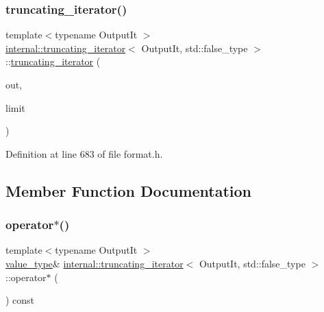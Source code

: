\subsubsection{\texorpdfstring{truncating\+\_\+iterator()}{truncating\_iterator()}}
{\footnotesize\ttfamily template$<$typename Output\+It $>$ \\
\hyperlink{classinternal_1_1truncating__iterator}{internal\+::truncating\+\_\+iterator}$<$ Output\+It, std\+::false\+\_\+type $>$\+::\hyperlink{classinternal_1_1truncating__iterator}{truncating\+\_\+iterator} (\begin{DoxyParamCaption}\item[{Output\+It}]{out,  }\item[{std\+::size\+\_\+t}]{limit }\end{DoxyParamCaption})\hspace{0.3cm}{\ttfamily [inline]}}



Definition at line 683 of file format.\+h.



\subsection{Member Function Documentation}
\mbox{\label{classinternal_1_1truncating__iterator_3_01_output_it_00_01std_1_1false__type_01_4_ab82a20d9b1cca826e7c84f3984f69adf}} 
\subsubsection{\texorpdfstring{operator$\ast$()}{operator*()}}
{\footnotesize\ttfamily template$<$typename Output\+It $>$ \\
\hyperlink{classinternal_1_1truncating__iterator_3_01_output_it_00_01std_1_1false__type_01_4_a2754973ff1a167f595594c80ff9faca2}{value\+\_\+type}\& \hyperlink{classinternal_1_1truncating__iterator}{internal\+::truncating\+\_\+iterator}$<$ Output\+It, std\+::false\+\_\+type $>$\+::operator$\ast$ (\begin{DoxyParamCaption}{ }\end{DoxyParamCaption}) const\hspace{0.3cm}{\ttfamily [inline]}}



